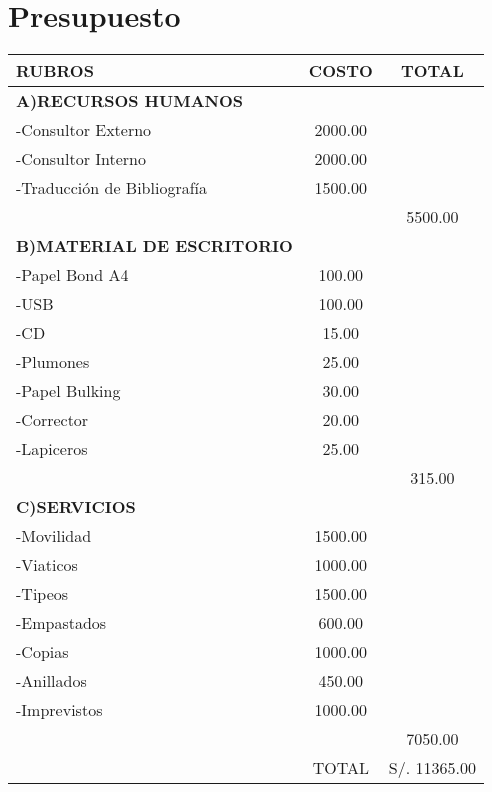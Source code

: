 \chapter{Presupuesto}

\begin{table}[h]
	\centering
	\begin{tabular}{|l|c|c|}
		\hline
		\textbf{RUBROS}	&	\textbf{COSTO}	&\textbf{TOTAL}	\\
		\hline
		\textbf{A)RECURSOS HUMANOS} &&\\
		-Consultor Externo	&  2000.00&\\
		-Consultor Interno	& 2000.00& \\
		-Traducción de Bibliografía& 1500.00&\\
		&&5500.00\\
		\hline
		\textbf{B)MATERIAL DE ESCRITORIO} &&\\
		-Papel Bond A4&100.00&\\
		-USB&100.00&\\
		-CD&15.00&\\
		-Plumones&25.00&\\
		-Papel Bulking&30.00&\\
		-Corrector&20.00&\\
		-Lapiceros&25.00&\\
		&&315.00\\
		\hline
		\textbf{C)SERVICIOS}&&\\
		-Movilidad&1500.00&\\
		-Viaticos&1000.00&\\
		-Tipeos&1500.00&\\
		-Empastados&600.00&\\
		-Copias&1000.00&\\
		-Anillados&450.00&\\
		-Imprevistos&1000.00&\\
		&&7050.00\\
		\hline
		&TOTAL& S/. 11365.00\\
		\hline
	\end{tabular}
	
\end{table}